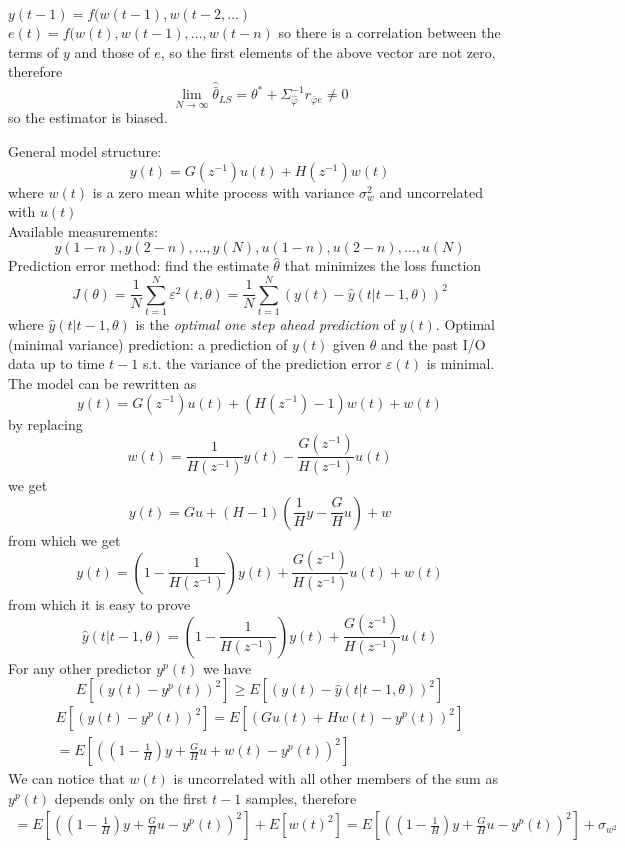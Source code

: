 \documentclass{book}
\theoremstyle{definition}
\theoremstyle{remark}
\theoremstyle{remark}
\begin{document}
$y(t-1) = f(w(t-1), w(t-2, \dots )$\\
$e(t) = f(w(t), w(t-1), \dots, w(t-n)$ so there is a correlation between the terms of $y$ and those of $e$, so the first elements of the above vector are not zero, therefore
\[
    \lim_{N\to\infty} \hat{\bar{\theta}}_{LS}=\theta^*+\Sigma_{\hat{\varphi}}^{-1}r_{\bar{\varphi}e}\neq 0
\]
so the estimator is biased.

General model structure:
\[
    y(t) = G(z^{-1})u(t) + H(z^{-1})w(t)
\]
where $w(t)$ is a zero mean white process with variance $\sigma^2_w$ and uncorrelated with $u(t)$\\
Available measurements:
\[
    y(1-n),y(2-n),\dots,y(N),u(1-n),u(2-n),\dots,u(N)
\]
Prediction error method: find the estimate $\hat{\theta}$ that minimizes the loss function
\[
J(\theta) = \frac{1}{N}\sum_{t=1}^N\varepsilon^2(t,\theta) = \frac{1}{N} \sum_{t=1}^N\left(y(t)-\hat{y}(t|t-1,\theta)\right)^2
\]
where $\hat{y}(t|t-1,\theta)$ is the \emph{optimal one step ahead prediction} of $y(t)$. Optimal (minimal variance)  prediction: a prediction of $y(t)$ given $\theta$ and the past I/O data up to time $t-1$ s.t. the variance of the prediction error $\varepsilon(t)$ is minimal.
The model can be rewritten as
\[
y(t) = G(z^{-1})u(t) + (H(z^{-1})-1)w(t)+w(t)
\]
by replacing 
\[
    w(t)=\displaystyle\frac{1}{H(z^{-1})}y(t)-\displaystyle\frac{G(z^{-1})}{H(z^{-1})}u(t)
\]
we get
\[
    y(t) = Gu+(H-1)\left(\displaystyle\frac{1}{H}y-\displaystyle\frac{G}{H}u\right)+w
\]
from which we get
\[
    y(t)=\left(1-\frac{1}{H(z^{-1})}\right) y(t) + \frac{G(z^{-1})}{H(z^{-1})}u(t)+w(t)
\]
from which it is easy to prove
\[
    \hat{y}(t|t-1,\theta)=\left(1-\frac{1}{H(z^{-1})}\right)y(t)+\frac{G(z^{-1})}{H(z^{-1})}u(t)
\]
For any other predictor $y^p(t)$ we have
\[
    E[(y(t)-y^p(t))^2]\geq E[(y(t)-\hat{y}(t|t-1,\theta))^2]
\]
\begin{gather*}
    E[(y(t)-y^p(t))^2]=E[(Gu(t)+Hw(t)-y^p(t))^2]\\
    =E[\left(\left(1-\frac{1}{H} \right)y+\frac{G}{H}u+w(t)-y^p(t)\right)^2]
\end{gather*}
We can notice that $w(t)$ is uncorrelated with all other members of the sum as $y^p(t)$ depends only on the first $t-1$ samples, therefore
\begin{gather*}
    =E\left[\left(\left(1-\frac{1}{H} \right)y+\frac{G}{H}u-y^p(t)\right)^2\right]+E[w(t)^2]
    =E\left[\left(\left(1-\frac{1}{H} \right)y+\frac{G}{H}u-y^p(t)\right)^2\right]+\sigma_{w^2}
\end{gather*}
\end{document}
